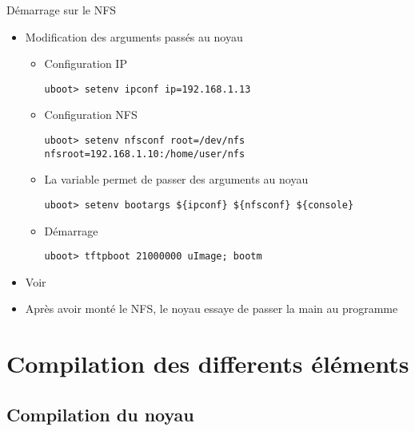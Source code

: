 \begin{frame}[fragile=singleslide]{Démarrage sur le NFS}
  \begin{itemize}
  \item Modification des arguments passés au noyau
    \begin{itemize}
    \item Configuration IP
      \begin{lstlisting}
uboot> setenv ipconf ip=192.168.1.13
      \end{lstlisting}
    \item Configuration NFS
      \begin{lstlisting}
uboot> setenv nfsconf root=/dev/nfs nfsroot=192.168.1.10:/home/user/nfs
      \end{lstlisting}
    \item La variable  permet de passer des arguments au noyau
      \begin{lstlisting}
uboot> setenv bootargs ${ipconf} ${nfsconf} ${console}
      \end{lstlisting}
    \item Démarrage
      \begin{lstlisting}
uboot> tftpboot 21000000 uImage; bootm
      \end{lstlisting}
    \end{itemize}
  \item Voir 
  \item Après avoir monté le NFS, le noyau essaye de passer la main au
    programme 
  \end{itemize}
\end{frame}

\section{Compilation des differents éléments}

\subsection{Compilation du noyau}

